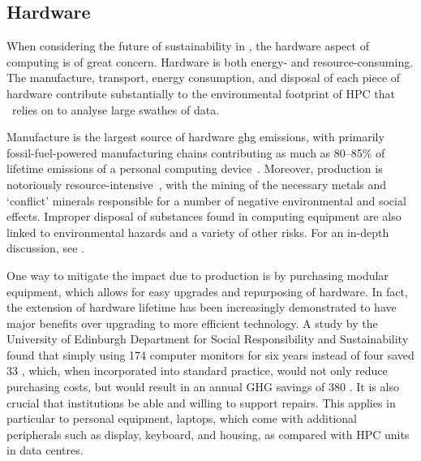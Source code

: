 \documentclass[../SustainableHEP.tex]{subfiles}
\begin{document}

\newpage

\subsection{Hardware}
\label{subsec:hardware}

When considering the future of sustainability in \ACR, the hardware aspect of computing is of great concern. Hardware is both energy- and resource-consuming. The manufacture, transport, energy consumption, and disposal of each piece of hardware contribute substantially to the environmental footprint of HPC that \ACR\ relies on to analyse large swathes of data. 

Manufacture is the largest source of hardware \acrshort{ghg} emissions, with primarily fossil-fuel-powered manufacturing chains contributing as much as 80--85\% of lifetime emissions of a personal computing device~\cite{Greenpeace_Oeko, OxfordLCA}.  Moreover, production is notoriously resource-intensive~\cite{Greenpeace_Oeko}, with the mining of the necessary metals and `conflict' minerals responsible for a number of negative environmental and social effects.  Improper disposal of substances found in computing equipment are also linked to environmental hazards and a variety of other risks.    For an in-depth discussion, see .

One way to mitigate the impact due to production is by purchasing modular equipment, which allows for easy upgrades and repurposing of hardware.  In fact, the extension of hardware lifetime has been increasingly demonstrated to have major benefits over upgrading to more efficient technology.  A study by the University of Edinburgh Department for Social Responsibility and Sustainability~\cite{UniEd} found that simply using 174 computer monitors for six years instead of four saved 33 \tCdOe, which, when incorporated into standard practice, would not only reduce purchasing costs, but would result in an annual GHG savings of 380 \tCdOe.  It is also crucial that institutions be able and willing to support repairs. This applies in particular to personal equipment, \eg laptops,  which come with additional peripherals such as display, keyboard, and housing, as compared with HPC units in data centres. 
\end{document}
